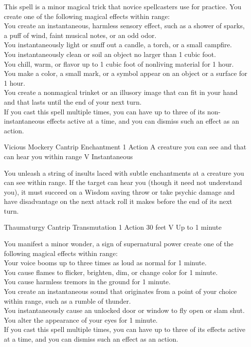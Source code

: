 \documentclass[letterpaper,openany,oneside,twocolumn]{book}
\begin{document}
This spell is a minor magical trick that novice spellcasters use for practice. You create one of the following magical effects within range:\\
You create an instantaneous, harmless sensory effect, such as a shower of sparks, a puff of wind, faint musical notes, or an odd odor.\\
You instantaneously light or snuff out a candle, a torch, or a small campfire.\\
You instantaneously clean or soil an object no larger than 1 cubic foot.\\
You chill, warm, or flavor up to 1 cubic foot of nonliving material for 1 hour.\\
You make a color, a small mark, or a symbol appear on an object or a surface for 1 hour.\\
You create a nonmagical trinket or an illusory image that can fit in your hand and that lasts until the end of your next turn.\\
If you cast this spell multiple times, you can have up to three of its non-instantaneous effects active at a time, and you can dismiss such an effect as an action.

\DndSpellHeader
  {Vicious Mockery}
  {Cantrip Enchantment}
  {1 Action}
  {A creature you can see and that can hear you within range}
  {V}
  {Instantaneous}

You unleash a string of insults laced with subtle enchantments at a creature you can see within range. If the target can hear you (though it need not understand you), it must succeed on a Wisdom saving throw or take  psychic damage and have disadvantage on the next attack roll it makes before the end of its next turn.

\DndSpellHeader
  {Thaumaturgy}
  {Cantrip Transmutation}
  {1 Action}
  {30 feet}
  {V}
  {Up to 1 minute}

You manifest a minor wonder, a sign of supernatural power create one of the following magical effects within range:\\
Your voice booms up to three times as loud as normal for 1 minute.\\
You cause flames to flicker, brighten, dim, or change color for 1 minute.\\
You cause harmless tremors in the ground for 1 minute.\\
You create an instantaneous sound that originates from a point of your choice within range, such as a rumble of thunder.\\
You instantaneously cause an unlocked door or window to fly open or slam shut.\\
You alter the appearance of your eyes for 1 minute.\\
If you cast this spell multiple times, you can have up to three of its effects active at a time, and you can dismiss such an effect as an action.\\
\end{document}
